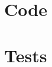 \documentclass{article}
\title{
\vspace{2in}
\textmd{\textbf{\hmwkClass}}\\
\normalsize\vspace{0.1in}\small{\hmwkDueDate}\\
\vspace{0.1in}\large{\textit{\hmwkClassInstructor\ \hmwkClassTime}}
\vspace{3in}
}
\author{\hmwkAuthorName}
\date{} %
\begin{document}
\maketitle
\newpage

\section{Code}




\newpage
\section{Tests}
\end{document}
